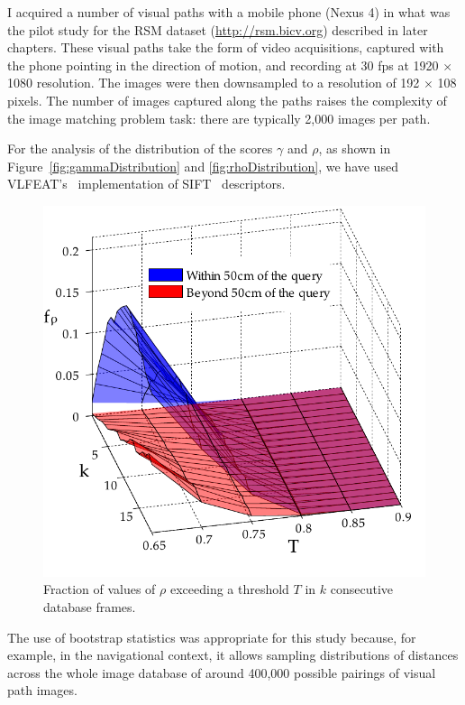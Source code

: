 I acquired a number of visual paths with a mobile phone (Nexus 4) in what was the pilot study for the RSM dataset (\url{http://rsm.bicv.org}) described in later chapters.  These visual paths take the form of video acquisitions, captured with the phone pointing in the direction of motion, and recording at 30 fps at 1920 $\times$ 1080 resolution. The images were then downsampled to a resolution of 192 $\times$ 108 pixels. The number of images captured along the paths raises the complexity of the image matching problem task: there are typically 2,000 images per path.

For the analysis of the distribution of the scores $\gamma$ and $\rho$, as shown in Figure~\ref{fig:gammaDistribution} and \ref{fig:rhoDistribution}, we have used VLFEAT's~\cite{Vedaldi2008} implementation of SIFT~\cite{Lowe2004} descriptors.

\begin{figure}
\begin{center}
\includegraphics[width=.8\linewidth]{./gfx/Chapter02/C1twoTestWithBootstrapping2.pdf}
\caption{Fraction of values of $\rho$ exceeding a threshold $T$ in $k$ consecutive database frames.}
\label{fig:rocTwoParametersC5}
\end{center}
\end{figure}

The use of bootstrap statistics was appropriate for this study because, for example, in the navigational context, it allows sampling distributions of distances across the whole image database of around 400,000 possible pairings of visual path images.

